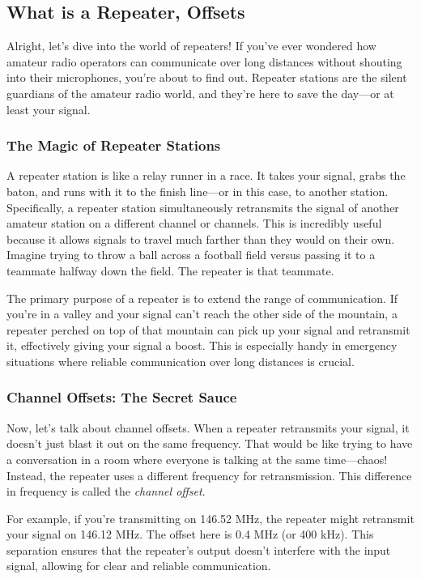 \subsection{What is a Repeater, Offsets}
\label{subsec:repeater-basics}

Alright, let’s dive into the world of repeaters! If you’ve ever wondered how amateur radio operators can communicate over long distances without shouting into their microphones, you’re about to find out. Repeater stations are the silent guardians of the amateur radio world, and they’re here to save the day—or at least your signal.

\subsubsection*{The Magic of Repeater Stations}

A repeater station is like a relay runner in a race. It takes your signal, grabs the baton, and runs with it to the finish line—or in this case, to another station. Specifically, a repeater station simultaneously retransmits the signal of another amateur station on a different channel or channels. This is incredibly useful because it allows signals to travel much farther than they would on their own. Imagine trying to throw a ball across a football field versus passing it to a teammate halfway down the field. The repeater is that teammate.

The primary purpose of a repeater is to extend the range of communication. If you’re in a valley and your signal can’t reach the other side of the mountain, a repeater perched on top of that mountain can pick up your signal and retransmit it, effectively giving your signal a boost. This is especially handy in emergency situations where reliable communication over long distances is crucial.

\subsubsection*{Channel Offsets: The Secret Sauce}

Now, let’s talk about channel offsets. When a repeater retransmits your signal, it doesn’t just blast it out on the same frequency. That would be like trying to have a conversation in a room where everyone is talking at the same time—chaos! Instead, the repeater uses a different frequency for retransmission. This difference in frequency is called the \textit{channel offset}.

For example, if you’re transmitting on 146.52 MHz, the repeater might retransmit your signal on 146.12 MHz. The offset here is 0.4 MHz (or 400 kHz). This separation ensures that the repeater’s output doesn’t interfere with the input signal, allowing for clear and reliable communication.

